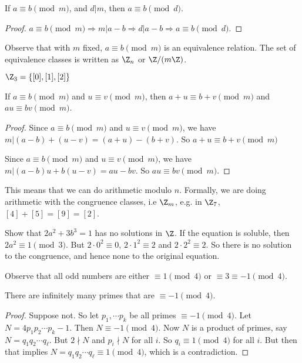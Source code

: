 \documentclass[a4paper]{article}
\begin{document}
  \begin{prop}
    If $a\equiv b\pmod m$, and $d | m$, then $a \equiv b\pmod d$.
  \end{prop}

  \begin{proof}
    $a\equiv b\pmod m \Rightarrow m | a - b \Rightarrow d | a - b \Rightarrow a \equiv b\pmod d$.
  \end{proof}

  Observe that with $m$ fixed, $a\equiv b\pmod m$ is an equivalence relation. The set of equivalence classes is written as $\Z_n$ or $\Z/(m\Z)$.

  \begin{eg}
    $\Z_3 = \{[0], [1], [2]\}$
  \end{eg}

  \begin{prop}
    If $a\equiv b\pmod m$ and $u\equiv v \pmod m$, then $a + u\equiv b + v\pmod m$ and $au \equiv bv \pmod m$.
  \end{prop}

  \begin{proof}
    Since $a\equiv b\pmod m$ and $u\equiv v \pmod m$, we have $m | (a - b) + (u - v) = (a + u) - (b + v)$. So $a + u\equiv b + v\pmod m$

    Since $a\equiv b\pmod m$ and $u\equiv v \pmod m$, we have $m | (a - b)u + b(u - v) = au - bv$. So $au \equiv bv \pmod m$.
  \end{proof}

  This means that we can do arithmetic modulo $n$. Formally, we are doing arithmetic with the congruence classes, i.e $\Z_m$, e.g. in $\Z_7$, $[4] + [5] = [9] = [2]$.

  \begin{eg}
    Show that $2a^2  + 3b^3 = 1$ has no solutions in $\Z$. If the equation is soluble, then $2a^2 \equiv 1\pmod 3$. But $2\cdot 0^2 \equiv 0$, $2\cdot 1^2\equiv 2$ and $2\cdot 2^2 \equiv 2$. So there is no solution to the congruence, and hence none to the original equation.
  \end{eg}

  Observe that all odd numbers are either $\equiv 1\pmod 4$ or $\equiv 3\equiv -1\pmod 4$.

  \begin{thm}
    There are infinitely many primes that are $\equiv -1 \pmod 4$.
  \end{thm}

  \begin{proof}
    Suppose not. So let $p_1, \cdots p_k$ be all primes $\equiv -1 \pmod 4$. Let $N = 4p_1p_2\cdots p_k - 1$. Then $N\equiv -1\pmod 4$. Now $N$ is a product of primes, say $N= q_1q_2\cdots q_\ell$. But $2\nmid N$ and $p_i\nmid N$ for all $i$. So $q_i \equiv 1\pmod 4$ for all $i$. But then that implies $N = q_1q_2\cdots q_\ell \equiv 1\pmod 4$, which is a contradiction.
  \end{proof}
\end{document}

